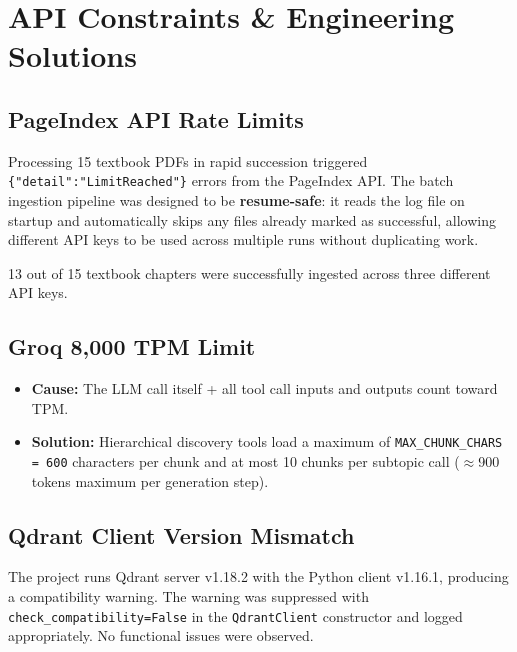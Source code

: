 \documentclass[12pt, a4paper]{article}
\begin{document}
\newpage
\section{API Constraints \& Engineering Solutions}

\subsection{PageIndex API Rate Limits}
Processing 15 textbook PDFs in rapid succession triggered \texttt{\{"detail":"LimitReached"\}} errors from the PageIndex API. The batch ingestion pipeline was designed to be \textbf{resume-safe}: it reads the log file on startup and automatically skips any files already marked as successful, allowing different API keys to be used across multiple runs without duplicating work.

13 out of 15 textbook chapters were successfully ingested across three different API keys.

\subsection{Groq 8,000 TPM Limit}
\begin{itemize}
    \item \textbf{Cause:} The LLM call itself + all tool call inputs and outputs count toward TPM.
    \item \textbf{Solution:} Hierarchical discovery tools load a maximum of \texttt{MAX\_CHUNK\_CHARS = 600} characters per chunk and at most 10 chunks per subtopic call ($\approx$900 tokens maximum per generation step).
\end{itemize}

\subsection{Qdrant Client Version Mismatch}
The project runs Qdrant server v1.18.2 with the Python client v1.16.1, producing a compatibility warning. The warning was suppressed with \texttt{check\_compatibility=False} in the \texttt{QdrantClient} constructor and logged appropriately. No functional issues were observed.

\newpage
\end{document}
